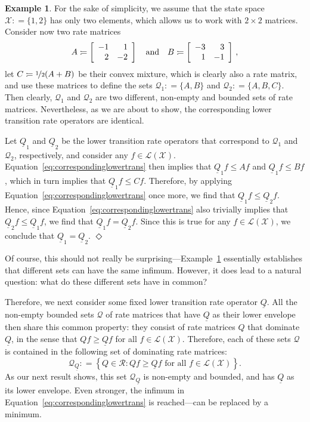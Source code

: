 \documentclass[10pt,a4paper]{paper}
\theoremstyle{definition}
\newtheorem{exmp}{Example}%
\newcommand{\states}{\mathcal{X}}
\newcommand{\gambles}{\mathcal{L}}
\newcommand{\gamblesX}{\gambles(\states)}
\newcommand{\rateset}{\mathcal{Q}}
\newcommand{\lrate}{\underline{Q}}
\newcommand{\coloneqq}{:\!=}
\newcommand{\exampleend}{\hfill$\Diamond$}
\begin{document}
\begin{exmp}\label{example:different_sets_same_lower_rate}
For the sake of simplicity, we assume that the state space $\states\coloneqq\{1,2\}$ has only two elements, which allows us to work with $2\times 2$ matrices. Consider now two rate matrices
\begin{equation*}
A\coloneqq\left[\begin{array}{rr}-1 & 1 \\2 & -2\end{array}\right]\quad\text{and}\quad
B\coloneqq\left[\begin{array}{rr}-3 & 3 \\1 & -1\end{array}\right]\,,
\vspace{7pt}
\end{equation*}
let $C\coloneqq \nicefrac{1}{2}(A+B)$ be their convex mixture, which is clearly also a rate matrix, and use these matrices to define the sets $\rateset_1\coloneqq\{A,B\}$ and $\rateset_2\coloneqq\{A,B,C\}$. Then clearly, $\rateset_1$ and $\rateset_2$ are two different, non-empty and bounded sets of rate matrices. Nevertheless, as we are about to show, the corresponding lower transition rate operators are identical.

Let $\lrate_1$ and $\lrate_2$ be the lower transition rate operators that correspond to $\rateset_1$ and $\rateset_2$, respectively, %
and consider any $f\in\gamblesX$. Equation~\eqref{eq:correspondinglowertrans} then implies that $\lrate_1f\leq Af$ and $\lrate_1f\leq Bf$, which in turn implies that $\lrate_1f\leq Cf$. Therefore, by applying Equation~\eqref{eq:correspondinglowertrans} once more, we find that $\lrate_1 f\leq\lrate_2 f$. Hence, since Equation~\eqref{eq:correspondinglowertrans} also trivially implies that $\lrate_2 f\leq\lrate_1 f$, we find that $\lrate_1 f=\lrate_2 f$. Since this is true for any $f\in\gamblesX$, we conclude that $\lrate_1=\lrate_2$.
\exampleend
\end{exmp}
Of course, this should not really be surprising---Example~\ref{example:different_sets_same_lower_rate} essentially establishes that different sets can have the same infimum. However, it does lead to a natural question: what do these different sets have in common?

Therefore, we next consider some fixed lower transition rate operator $\lrate$.
All the non-empty bounded sets $\rateset$ of rate matrices that have $\lrate$ as their lower envelope then share this common property: they consist of rate matrices $Q$ that dominate $\lrate$, in the sense that $Qf\geq\lrate f$ for all $f\in\gamblesX$. Therefore, each of these sets $\rateset$ is contained in the following set of dominating rate matrices:
\begin{equation}\label{eq:dominatingratematrices}
\rateset_{\lrate}\coloneqq
\left\{
Q\in\mathcal{R}
\colon
Qf\geq\lrate f\text{ for all $f\in\gamblesX$}
\right\}.
\end{equation}
As our next result shows, this set $\rateset_{\lrate}$ is non-empty and bounded, and has $\lrate$ as its lower envelope. Even stronger, the infimum in Equation~\eqref{eq:correspondinglowertrans} is reached---can be replaced by a minimum.
\end{document}
